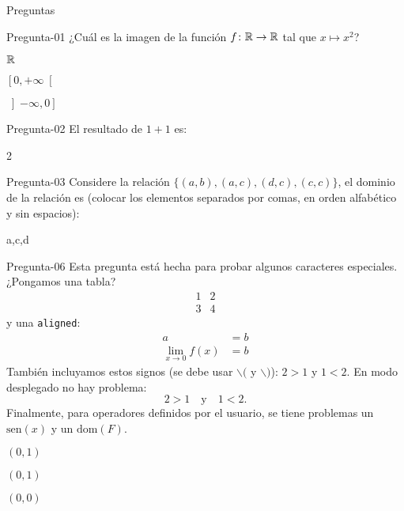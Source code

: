\documentclass[10pt]{article}
\begin{document}
\begin{quiz}{Preguntas}

\begin{multi}[%
    feedback={La respuesta correcta es $\left[0,+\infty\right[$}
    ]%
    {Pregunta-01}
    ¿Cuál es la imagen de la función $f\colon \mathbb{R} \rightarrow \mathbb{R}$ tal que $x\mapsto x^2$?
    \item $\mathbb{R}$
    \item* $\left[0,+\infty\right[$
    \item $\left]-\infty,0\right]$
\end{multi}

\begin{numerical}[tolerance=0.1,%
    feedback={La suma es igual a $2$.}
    ]%
    {Pregunta-02}
    El resultado de $1+1$ es:
    \item 2
\end{numerical}

\begin{shortanswer}[%
    feedback={El dominio de la relación es $\{a,c,d\}$}
    ]%
    {Pregunta-03}
    Considere la relación $\{(a,b), (a,c), (d,c), (c,c)\}$, el dominio de la relación es (colocar los elementos separados por comas, en orden alfabético y sin espacios):
    \item a,c,d
\end{shortanswer}

\begin{multi}[]%
    {Pregunta-06}
    Esta pregunta está hecha para probar algunos caracteres especiales. ¿Pongamos una tabla?
    \[
        \begin{array}{c|c}
            1 & 2 \\\hline
            3 & 4
        \end{array}
    \]
    y una \texttt{aligned}:
    \[
        \begin{aligned}
            a & = b\\
            \lim_{x\to0 }f(x) & = b
        \end{aligned}
    \]
    También incluyamos estos signos (se debe usar $\backslash($ y $\backslash)$): \(2>1\) y \(1<2\). En modo desplegado no hay problema:
    \[
        2>1 \quad\text{y}\quad 1<2. 
    \]
    Finalmente, para operadores definidos por el usuario, se tiene problemas
    un $\text{sen}(x)$
    y 
    un $\text{dom}(F)$.
    \item $(0,1)$
    \item $(0,1)$
    \item* $(0,0)$
\end{multi}

\end{quiz}
\end{document}
